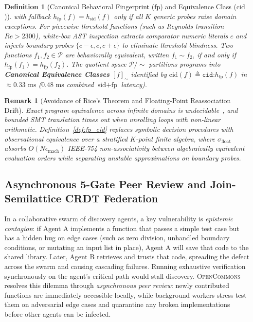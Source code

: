 \documentclass[10pt,twocolumn]{article}
\newtheorem{definition}{Definition}
\newtheorem{remark}{Remark}
\begin{document}
\begin{definition}[Canonical Behavioral Fingerprint ($\text{fp}$) and Equivalence Class ($\text{cid}$)]
with fallback $h_{\text{fp}}(f) = h_{\text{sid}}(f)$ only if all $K$ generic probes raise domain exceptions. For piecewise threshold functions (such as Reynolds transition $Re > 2300$), white-box AST inspection extracts comparator numeric literals $c$ and injects boundary probes $\{c - \epsilon, c, c + \epsilon\}$ to eliminate threshold blindness. Two functions $f_1, f_2 \in \mathcal{P}$ are behaviorally equivalent, written $f_1 \sim f_2$, if and only if $h_{\text{fp}}(f_1) = h_{\text{fp}}(f_2)$. The quotient space $\mathcal{P} / {\sim}$ partitions programs into \textbf{Canonical Equivalence Classes} $[f]_{\sim}$ identified by $\text{cid}(f) \triangleq \texttt{cid:}h_{\text{fp}}(f)$ in $\approx 0.33\text{ ms}$ ($0.48\text{ ms}$ combined $\text{sid} + \text{fp}$ latency).
\end{definition}

\begin{remark}[Avoidance of Rice's Theorem and Floating-Point Reassociation Drift]
Exact program equivalence across infinite domains is undecidable~\cite{rice1953classes}, and bounded SMT translation times out when unrolling loops with non-linear arithmetic. Definition~\ref{def:fp_cid} replaces symbolic decision procedures with observational equivalence over a stratified $K$-point finite algebra, where $\sigma_{\text{float}}$ absorbs $O(N \epsilon_{\text{mach}})$ IEEE-754 non-associativity between algebraically equivalent evaluation orders while separating unstable approximations on boundary probes.
\end{remark}

\subsection{Asynchronous 5-Gate Peer Review and Join-Semilattice CRDT Federation}

In a collaborative swarm of discovery agents, a key vulnerability is \emph{epistemic contagion}: if Agent A implements a function that passes a simple test case but has a hidden bug on edge cases (such as zero division, unhandled boundary conditions, or mutating an input list in place), Agent A will save that code to the shared library. Later, Agent B retrieves and trusts that code, spreading the defect across the swarm and causing cascading failures. Running exhaustive verification synchronously on the agent's critical path would stall discovery. \textsc{OpenCommons} resolves this dilemma through \emph{asynchronous peer review}: newly contributed functions are immediately accessible locally, while background workers stress-test them on adversarial edge cases and quarantine any broken implementations before other agents can be infected.
\end{document}
